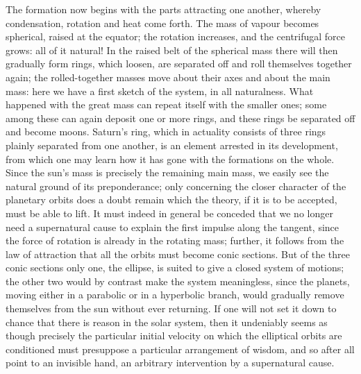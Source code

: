 \documentclass[12pt,a4paper]{book}
\begin{document}
The formation now begins with the parts attracting one another, whereby condensation, rotation and heat
come forth. The mass of vapour becomes spherical, raised at the equator; the rotation increases, and the
centrifugal force grows: all of it natural! In the raised belt of the spherical mass there will
then gradually form rings, which loosen, are separated off and roll themselves together again; the
rolled-together masses move about their axes and about the main mass: here we have a first sketch of the
system, in all naturalness. What happened with the great mass can repeat itself with the smaller ones;
some among these can again deposit one or more rings, and these rings be separated off and become moons.
Saturn's ring, which in actuality consists of three rings plainly separated from one another, is an element
arrested in its development, from which one may learn how it has gone with the formations on the whole.
Since the sun's mass is precisely the remaining main mass, we easily see the natural ground of its
preponderance; only concerning the closer character of the planetary orbits does a doubt remain which the
theory, if it is to be accepted, must be able to lift. It must indeed in general be conceded that we no
longer need a supernatural cause to explain the first impulse along the tangent, since the force of rotation
is already in the rotating mass; further, it follows from the law of attraction that all the orbits must
become conic sections. But of the three conic sections only one, the ellipse, is suited to give a closed
system of motions; the other two would by contrast make the system meaningless, since the planets, moving
either in a parabolic or in a hyperbolic branch, would gradually remove themselves from the sun without
ever returning. If one will not set it down to chance that there is reason in the solar system, then it
undeniably seems as though precisely the particular initial velocity on which the elliptical orbits are
conditioned must presuppose a particular arrangement of wisdom, and so after all point to an invisible
hand, an arbitrary
intervention by a supernatural cause.
\end{document}
